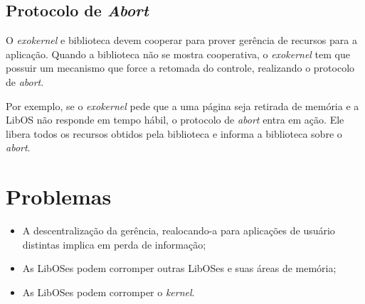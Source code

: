 \subsection{Protocolo de \textit{Abort}}
O \textit{exokernel} e biblioteca devem cooperar para prover gerência de recursos para a aplicação. Quando a biblioteca não se mostra cooperativa, o \textit{exokernel} tem que possuir um mecanismo que force a retomada do controle, realizando o protocolo de \textit{abort}.

Por exemplo, se o \textit{exokernel} pede que a uma página seja retirada de memória e a LibOS não responde em tempo hábil, o protocolo de \textit{abort} entra em ação. Ele libera todos os recursos obtidos pela biblioteca e informa a biblioteca sobre o \textit{abort}.

\section{Problemas}
\begin{itemize}
  \item A descentralização da gerência, realocando-a para aplicações de usuário distintas implica em perda de informação;

  \item As LibOSes podem corromper outras LibOSes e suas áreas de memória;

  \item As LibOSes podem corromper o \textit{kernel}.
\end{itemize}
